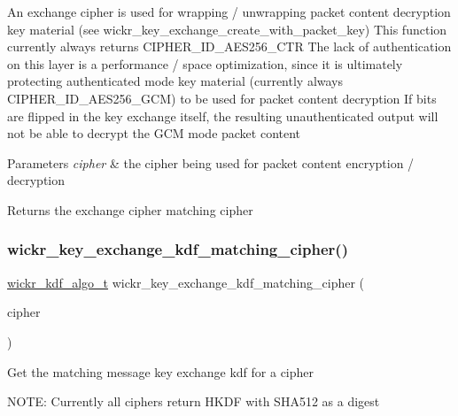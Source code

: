 An exchange cipher is used for wrapping / unwrapping packet content decryption key material (see wickr\+\_\+key\+\_\+exchange\+\_\+create\+\_\+with\+\_\+packet\+\_\+key) This function currently always returns C\+I\+P\+H\+E\+R\+\_\+\+I\+D\+\_\+\+A\+E\+S256\+\_\+\+C\+TR The lack of authentication on this layer is a performance / space optimization, since it is ultimately protecting authenticated mode key material (currently always C\+I\+P\+H\+E\+R\+\_\+\+I\+D\+\_\+\+A\+E\+S256\+\_\+\+G\+CM) to be used for packet content decryption If bits are flipped in the key exchange itself, the resulting unauthenticated output will not be able to decrypt the G\+CM mode packet content


\begin{DoxyParams}{Parameters}
{\em cipher} & the cipher being used for packet content encryption / decryption \\
\hline
\end{DoxyParams}
\begin{DoxyReturn}{Returns}
the exchange cipher matching \textquotesingle{}cipher\textquotesingle{} 
\end{DoxyReturn}
\mbox{\label{group__wickr__crypto__engine_ga6cdd263ddccd0b28a85ed61889805e60}} 
\subsubsection{\texorpdfstring{wickr\+\_\+key\+\_\+exchange\+\_\+kdf\+\_\+matching\+\_\+cipher()}{wickr\_key\_exchange\_kdf\_matching\_cipher()}}
{\footnotesize\ttfamily \mbox{\hyperlink{structwickr__kdf__algo}{wickr\+\_\+kdf\+\_\+algo\+\_\+t}} wickr\+\_\+key\+\_\+exchange\+\_\+kdf\+\_\+matching\+\_\+cipher (\begin{DoxyParamCaption}\item[{\mbox{\hyperlink{structwickr__cipher}{wickr\+\_\+cipher\+\_\+t}}}]{cipher }\end{DoxyParamCaption})}

Get the matching message key exchange kdf for a cipher

N\+O\+TE\+: Currently all ciphers return H\+K\+DF with S\+H\+A512 as a digest


